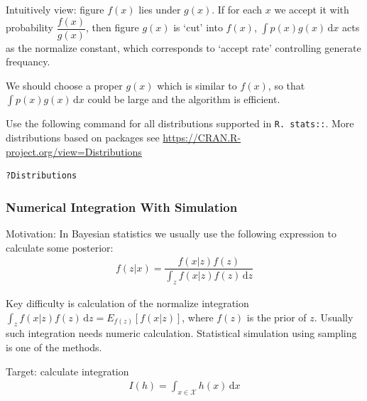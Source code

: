 \begin{itemize}[topsep=2pt,itemsep=0pt]
    Intuitively view: figure $ f(x) $ lies under $ g(x) $. If for each $ x $ we accept it with probability $ \dfrac{f(x)}{g(x)} $, then figure $ g(x) $ is `cut' into $ f(x) $, $ \int p(x)g(x) \,\mathrm{d}x $ acts as the normalize constant, which corresponds to `accept rate' controlling generate frequancy.

    We should choose a proper $ g(x) $ which is similar to $ f(x) $, so that $ \int p(x)g(x) \,\mathrm{d}x $ could be large and the algorithm is efficient.    
    
\end{itemize}

\begin{rcode}
    Use the following command for all distributions supported in \lstinline|R. stats::|. More distributions based on packages see \url{https://CRAN.R-project.org/view=Distributions}
\begin{lstlisting}[language=R]
?Distributions
\end{lstlisting}
\end{rcode}

\subsubsection{Numerical Integration With Simulation}   
    Motivation: In Bayesian statistics we usually use the following expression to calculate some posterior:
    \begin{align}
        f(z|x)=\dfrac{f(x|z)f(z)}{\displaystyle \int_z f(x|z)f(z) \,\mathrm{d}z} 
    \end{align}
    
    Key difficulty is calculation of the normalize integration $ \displaystyle \int_z f(x|z)f(z) \,\mathrm{d}z =E_{f(z)}[f(x|z)]$, where $ f(z) $ is the prior of $ z $. Usually such integration needs numeric calculation. Statistical simulation using sampling is one of the methods.

    Target: calculate integration
    \begin{align}
        I(h)=\int_{x\in \mathcal{X} } h(x) \,\mathrm{d}x 
    \end{align}
    
